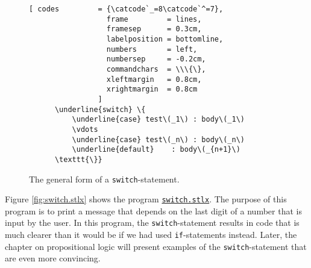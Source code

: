 \begin{figure}[!ht]
  \centering
\begin{Verbatim}[ codes         = {\catcode`_=8\catcode`^=7},
                  frame         = lines, 
                  framesep      = 0.3cm, 
                  labelposition = bottomline,
                  numbers       = left,
                  numbersep     = -0.2cm,
                  commandchars  = \\\{\},
                  xleftmargin   = 0.8cm,
                  xrightmargin  = 0.8cm
                ]
      \underline{switch} \{
          \underline{case} test\(_1\) : body\(_1\) 
          \vdots
          \underline{case} test\(_n\) : body\(_n\)
          \underline{default}    : body\(_{n+1}\)
      \texttt{\}}
\end{Verbatim}
\vspace*{-0.3cm}
\caption{The general form of a \texttt{switch}-statement.}  \label{fig:case}
\end{figure} 

Figure \ref{fig:switch.stlx} shows the program 
\href{https://github.com/karlstroetmann/Logik/blob/master/SetlX/switch.stlx}{\texttt{switch.stlx}}.
The purpose of this program is to print a message that depends on the last digit of a number that is input by
the user.  In this program, the \texttt{switch}-statement  results in code that is much clearer than
it would be if we had
used \texttt{if}-statements instead.  Later, the chapter on propositional logic will present examples of the
\texttt{switch}-statement that are even more convincing.


